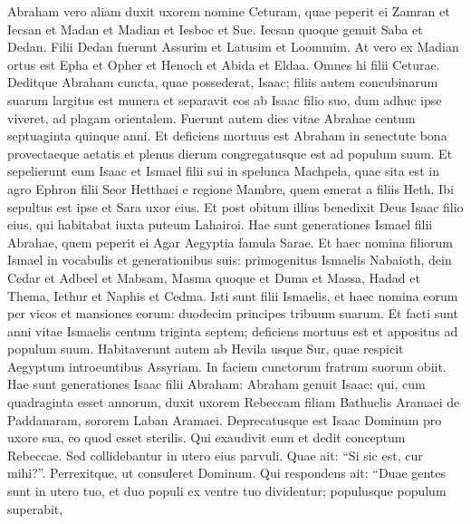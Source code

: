 \begin{biblechapter}
\begin{biblechapter}
\begin{biblechapter}
\begin{biblechapter}
\begin{biblechapter}
\begin{biblechapter}
\begin{biblechapter}
\begin{biblechapter}
\begin{biblechapter}
\begin{biblechapter}
\begin{biblechapter}
\begin{biblechapter}
\begin{biblechapter}
\begin{biblechapter}
\begin{biblechapter}
\begin{biblechapter}
\begin{biblechapter}
\begin{biblechapter}
\begin{biblechapter}
\begin{biblechapter}
\begin{biblechapter}
\begin{biblechapter}
\begin{biblechapter}
\begin{biblechapter}
\begin{biblechapter}
\verse Abraham vero aliam duxit uxorem nomine Ceturam, 
\verse quae peperit ei Zamran et Iecsan et Madan et Madian et Iesboc et Sue. 
 \verse Iecsan quoque genuit Saba et Dedan. Filii Dedan fuerunt Assurim et Latusim et Loommim. 
\verse At vero ex Madian ortus est Epha et Opher et Henoch et Abida et Eldaa. Omnes hi filii Ceturae.
 \verse Deditque Abraham cuncta, quae possederat, Isaac; 
\verse filiis autem concubinarum suarum largitus est munera et separavit eos ab Isaac filio suo, dum adhuc ipse viveret, ad plagam orientalem.
 \verse Fuerunt autem dies vitae Abrahae centum septuaginta quinque anni. 
\verse Et deficiens mortuus est Abraham in senectute bona provectaeque aetatis et plenus dierum congregatusque est ad populum suum. 
\verse Et sepelierunt eum Isaac et Ismael filii sui in spelunca Machpela, quae sita est in agro Ephron filii Seor Hetthaei e regione Mambre, 
\verse quem emerat a filiis Heth. Ibi sepultus est ipse et Sara uxor eius.
 \verse Et post obitum illius benedixit Deus Isaac filio eius, qui habitabat iuxta puteum Lahairoi.
 \verse Hae sunt generationes Ismael filii Abrahae, quem peperit ei Agar Aegyptia famula Sarae. 
\verse Et haec nomina filiorum Ismael in vocabulis et generationibus suis: primogenitus Ismaelis Nabaioth, dein Cedar et Adbeel et Mabsam, 
\verse Masma quoque et Duma et Massa, 
\verse Hadad et Thema, Iethur et Naphis et Cedma. 
\verse Isti sunt filii Ismaelis, et haec nomina eorum per vicos et mansiones eorum: duodecim principes tribuum suarum.
 \verse Et facti sunt anni vitae Ismaelis centum triginta septem; deficiens mortuus est et appositus ad populum suum. 
\verse Habitaverunt autem ab Hevila usque Sur, quae respicit Aegyptum introeuntibus Assyriam. In faciem cunctorum fratrum suorum obiit.
 \verse Hae sunt generationes Isaac filii Abraham: Abraham genuit Isaac; 
\verse qui, cum quadraginta esset annorum, duxit uxorem Rebeccam filiam Bathuelis Aramaei de Paddanaram, sororem Laban Aramaei. 
\verse Deprecatusque est Isaac Dominum pro uxore sua, eo quod esset sterilis. Qui exaudivit eum et dedit conceptum Rebeccae. 
\verse Sed collidebantur in utero eius parvuli. Quae ait: “Si sic est, cur mihi?”. Perrexitque, ut consuleret Dominum. 
\verse Qui respondens ait:
 “Duae gentes sunt in utero tuo,
 et duo populi ex ventre tuo dividentur;
 populusque populum superabit,

\end{biblechapter}
\end{biblechapter}
\end{biblechapter}
\end{biblechapter}
\end{biblechapter}
\end{biblechapter}
\end{biblechapter}
\end{biblechapter}
\end{biblechapter}
\end{biblechapter}
\end{biblechapter}
\end{biblechapter}
\end{biblechapter}
\end{biblechapter}
\end{biblechapter}
\end{biblechapter}
\end{biblechapter}
\end{biblechapter}
\end{biblechapter}
\end{biblechapter}
\end{biblechapter}
\end{biblechapter}
\end{biblechapter}
\end{biblechapter}
\end{biblechapter}
